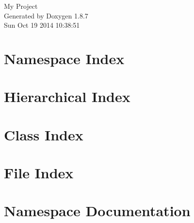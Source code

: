 \documentclass[twoside]{book}
\newcommand{\+}{\discretionary{\mbox{\scriptsize$\hookleftarrow$}}{}{}}
\newcommand{\clearemptydoublepage}{%
  \newpage{\pagestyle{empty}\cleardoublepage}%
}
\begin{document}
\hypersetup{pageanchor=false,
             bookmarks=true,
             bookmarksnumbered=true,
             pdfencoding=unicode
            }
\begin{titlepage}
\vspace*{7cm}
\begin{center}%
{\Large My Project }\\
\vspace*{1cm}
{\large Generated by Doxygen 1.8.7}\\
\vspace*{0.5cm}
{\small Sun Oct 19 2014 10:38:51}\\
\end{center}
\end{titlepage}
\clearemptydoublepage
\tableofcontents
\clearemptydoublepage
{}
\hypersetup{pageanchor=true}

\chapter{Namespace Index}

\chapter{Hierarchical Index}

\chapter{Class Index}

\chapter{File Index}

\chapter{Namespace Documentation}



\end{document}
